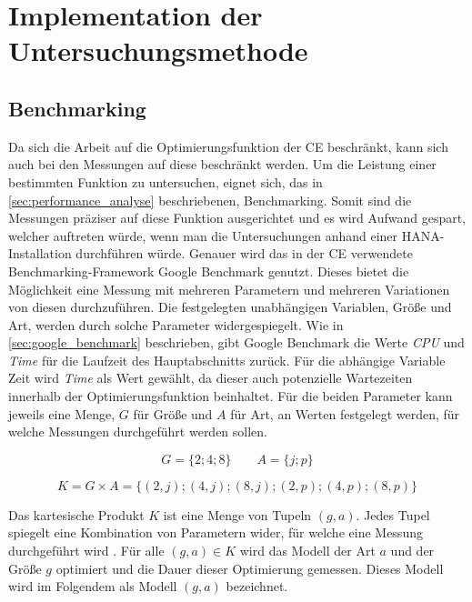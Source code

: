\chapter{Implementation der Untersuchungsmethode}

\section{Benchmarking}

Da sich die Arbeit auf die Optimierungsfunktion der \ac{CE} beschränkt, kann
sich auch bei den Messungen auf diese beschränkt werden. Um die Leistung einer
bestimmten Funktion zu untersuchen, eignet sich, das in
\autoref{sec:performance_analyse} beschriebenen, Benchmarking. Somit sind
die Messungen präziser auf diese Funktion ausgerichtet und es wird Aufwand
gespart, welcher auftreten würde, wenn man die Untersuchungen anhand einer
HANA-Installation durchführen würde. Genauer wird das in der \ac{CE} verwendete
Benchmarking-Framework Google Benchmark genutzt. Dieses bietet die Möglichkeit
eine Messung mit mehreren Parametern und mehreren Variationen von diesen
durchzuführen. Die festgelegten unabhängigen Variablen, Größe und Art, werden
durch solche Parameter widergespiegelt. Wie in \autoref{sec:google_benchmark}
beschrieben, gibt Google Benchmark die Werte \textit{CPU} und \textit{Time} für
die Laufzeit des Hauptabschnitts zurück. Für die abhängige Variable Zeit wird
\textit{Time} als Wert gewählt, da dieser auch potenzielle Wartezeiten
innerhalb der Optimierungsfunktion beinhaltet. Für die beiden Parameter kann
jeweils eine Menge, \zB $G$ für Größe und $A$ für Art, an Werten festgelegt
werden, für welche Messungen durchgeführt werden sollen.

\begin{equation*}
    G=\{2;4;8\}\qquad
    A=\{j;p\}
\end{equation*}


\begin{equation*}
    K = G \times A = \{(2,j);(4,j);(8,j);(2,p);(4,p);(8,p)\}
\end{equation*}

Das kartesische Produkt $K$ ist eine Menge von Tupeln $(g,a)$. Jedes Tupel
spiegelt eine Kombination von Parametern wider, für welche eine Messung
durchgeführt wird \autocite[vgl.][50]{Mengenlehre}. Für alle $(g,a) \in K$ wird
das Modell der Art $a$ und der Größe $g$ optimiert und die Dauer dieser
Optimierung gemessen. Dieses Modell wird im Folgendem als Modell $(g,a)$
bezeichnet.


